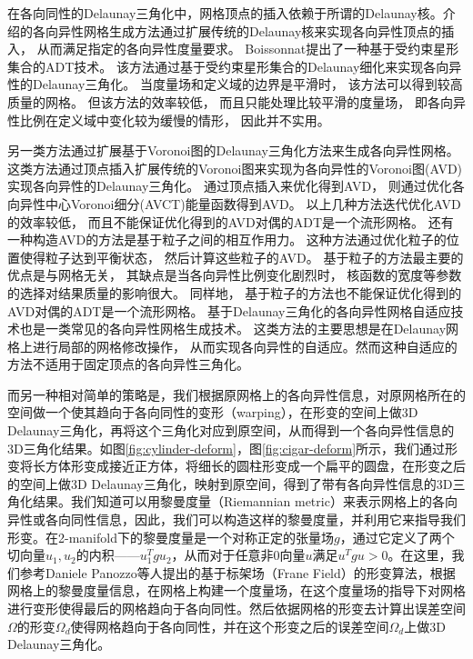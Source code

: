 在各向同性的Delaunay三角化中，网格顶点的插入依赖于所谓的Delaunay核。\cite{Frey:2007:MGA:1205626, Dobrzynski2008}介绍的各向异性网格生成方法通过扩展传统的Delaunay核来实现各向异性顶点的插入， 从而满足指定的各向异性度量要求。 Boissonnat\cite{Boissonnat:2008:LUA:1377676.1377724, boissonnat:inria-00615486, boissonnat:hal-01146307}提出了一种基于受约束星形集合的ADT技术。 该方法通过基于受约束星形集合的Delaunay细化来实现各向异性的Delaunay三角化。 当度量场和定义域的边界是平滑时， 该方法可以得到较高质量的网格。 但该方法的效率较低， 而且只能处理比较平滑的度量场， 即各向异性比例在定义域中变化较为缓慢的情形， 因此并不实用。

另一类方法通过扩展基于Voronoi图的Delaunay三角化方法来生成各向异性网格。 这类方法通过顶点插入扩展传统的Voronoi图来实现为各向异性的Voronoi图(AVD)实现各向异性的Delaunay三角化。 \cite{Labelle:2003:AVD:777792.777822}通过顶点插入来优化得到AVD， \cite{Du:2005:ACV:1046640.1046658, Valette:2008:GRT:1340081.1340168, Levy:2010:LPC:1778765.1778856, bruno:hal-00804558}则通过优化各向异性中心Voronoi细分(AVCT)能量函数得到AVD。 以上几种方法迭代优化AVD的效率较低， 而且不能保证优化得到的AVD对偶的ADT是一个流形网格\cite{Canas2011}。 还有一种构造AVD的方法是基于粒子之间的相互作用力\cite{ATPSCPE, PASM}。 这种方法通过优化粒子的位置使得粒子达到平衡状态， 然后计算这些粒子的AVD。 基于粒子的方法最主要的优点是与网格无关， 其缺点是当各向异性比例变化剧烈时， 核函数的宽度等参数的选择对结果质量的影响很大。 同样地， 基于粒子的方法也不能保证优化得到的AVD对偶的ADT是一个流形网格。
基于Delaunay三角化的各向异性网格自适应技术也是一类常见的各向异性网格生成技术\cite{Jiao2009}。 这类方法的主要思想是在Delaunay网格上进行局部的网格修改操作， 从而实现各向异性的自适应。然而这种自适应的方法不适用于固定顶点的各向异性三角化。

而另一种相对简单的策略是，我们根据原网格上的各向异性信息，对原网格所在的空间做一个使其趋向于各向同性的变形（warping），在形变的空间上做3D Delaunay三角化，再将这个三角化对应到原空间，从而得到一个各向异性信息的3D三角化结果。如图\ref{fig:cylinder-deform}，图\ref{fig:cigar-deform}所示，我们通过形变将长方体形变成接近正方体，将细长的圆柱形变成一个扁平的圆盘，在形变之后的空间上做3D Delaunay三角化，映射到原空间，得到了带有各向异性信息的3D三角化结果。我们知道可以用黎曼度量（Riemannian metric）来表示网格上的各向异性或各向同性信息，因此，我们可以构造这样的黎曼度量，并利用它来指导我们形变。在2-manifold下的黎曼度量是一个对称正定的张量场$g$，通过它定义了两个切向量$u_1, u_2$的内积——$u_1^T g u_2$，从而对于任意非0向量$u$满足$u^T g u>0$。在这里，我们参考Daniele Panozzo等人提出的基于标架场（Frane Field）的形变算法\cite{frame-field-warping}，根据网格上的黎曼度量信息，在网格上构建一个度量场，在这个度量场的指导下对网格进行变形使得最后的网格趋向于各向同性。然后依据网格的形变去计算出误差空间$\Omega$的形变$\Omega_d$使得网格趋向于各向同性，并在这个形变之后的误差空间$\Omega_d$上做3D Delaunay三角化。

